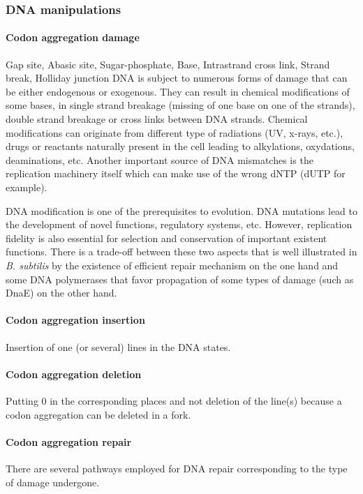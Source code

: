 \subsubsection{DNA manipulations}
\paragraph{Codon aggregation damage}
\textcolor[rgb]{1.00,0.00,0.00}{Gap site, Abasic site, Sugar-phosphate, Base, Intrastrand cross link, Strand break, Holliday junction}
DNA is subject to numerous forms of damage that can be either endogenous or exogenous. They can result in chemical modifications of some bases, in single strand breakage (missing of one base on one of the strands), double strand breakage or cross links between DNA strands. Chemical modifications can originate from different type of radiations (UV, x-rays, etc.), drugs or reactants naturally present in the cell leading to alkylations, oxydations, deaminations, etc. Another important source of DNA mismatches is the replication machinery itself which can make use of the wrong dNTP (dUTP for example).

DNA modification is one of the prerequisites to evolution. DNA mutations lead to the development of novel functions, regulatory systems, etc. However, replication fidelity is also essential for selection and conservation of important existent functions. There is a trade-off between these two aspects that is well illustrated in \textit{B. subtilis} by the existence of efficient repair mechanism on the one hand and some DNA polymerases that favor propagation of some types of damage (such as DnaE) on the other hand.



\paragraph{Codon aggregation insertion}
Insertion of one (or several) lines in the DNA states.

\paragraph{Codon aggregation deletion}
Putting 0 in the corresponding places and not deletion of the line(s) because a codon aggregation can be deleted in a fork.

\paragraph{Codon aggregation repair}
There are several pathways employed for DNA repair corresponding to the type of damage undergone.

